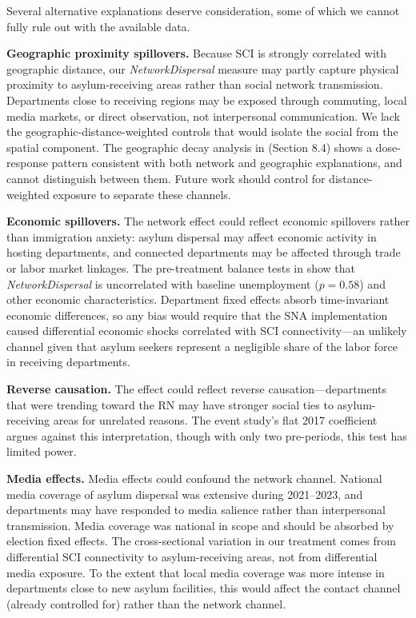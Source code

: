 \documentclass[12pt]{article}
\begin{document}
Several alternative explanations deserve consideration, some of which we cannot fully rule out with the available data.

\textbf{Geographic proximity spillovers.} Because SCI is strongly correlated with geographic distance, our \textit{NetworkDispersal} measure may partly capture physical proximity to asylum-receiving areas rather than social network transmission. Departments close to receiving regions may be exposed through commuting, local media markets, or direct observation, not interpersonal communication. We lack the geographic-distance-weighted controls that would isolate the social from the spatial component. The geographic decay analysis in  (Section 8.4) shows a dose-response pattern consistent with both network and geographic explanations, and cannot distinguish between them. Future work should control for distance-weighted exposure to separate these channels.

\textbf{Economic spillovers.} The network effect could reflect economic spillovers rather than immigration anxiety: asylum dispersal may affect economic activity in hosting departments, and connected departments may be affected through trade or labor market linkages. The pre-treatment balance tests in  show that \textit{NetworkDispersal} is uncorrelated with baseline unemployment ($p = 0.58$) and other economic characteristics. Department fixed effects absorb time-invariant economic differences, so any bias would require that the SNA implementation caused differential economic shocks correlated with SCI connectivity---an unlikely channel given that asylum seekers represent a negligible share of the labor force in receiving departments.

\textbf{Reverse causation.} The effect could reflect reverse causation---departments that were trending toward the RN may have stronger social ties to asylum-receiving areas for unrelated reasons. The event study's flat 2017 coefficient argues against this interpretation, though with only two pre-periods, this test has limited power.

\textbf{Media effects.} Media effects could confound the network channel. National media coverage of asylum dispersal was extensive during 2021--2023, and departments may have responded to media salience rather than interpersonal transmission. Media coverage was national in scope and should be absorbed by election fixed effects. The cross-sectional variation in our treatment comes from differential SCI connectivity to asylum-receiving areas, not from differential media exposure. To the extent that local media coverage was more intense in departments close to new asylum facilities, this would affect the contact channel (already controlled for) rather than the network channel.
\end{document}
